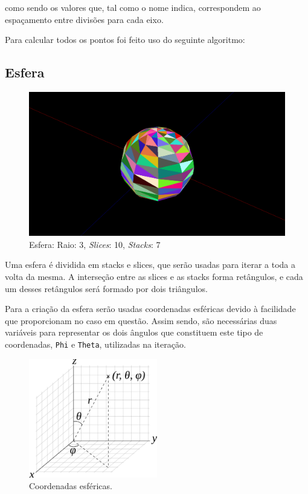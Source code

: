 \documentclass[a4paper]{article}
\begin{document}
como sendo os valores que, tal como o nome indica, correspondem ao espaçamento entre divisões para cada eixo.

Para calcular todos os pontos foi feito uso do seguinte algoritmo:


\subsection{Esfera}

\begin{figure}[H]
    \centering
    \includegraphics[width=\textwidth]{sphere.png}
    \caption{Esfera: Raio: 3, \textit{Slices}: 10, \textit{Stacks}: 7}
\end{figure}

Uma esfera é dividida em stacks e slices, que serão usadas para iterar a toda a volta da mesma. A interseção entre as slices e as stacks forma retângulos, e cada um desses retângulos será formado por dois triângulos.


Para a criação da esfera serão usadas coordenadas esféricas devido à facilidade que proporcionam no caso em questão. Assim sendo, são necessárias duas variáveis para representar os dois ângulos que constituem este tipo de coordenadas, \texttt{Phi} e \texttt{Theta}, utilizadas na iteração.

\begin{figure}[H]
    \centering
    \includegraphics[width=0.5\textwidth]{coords.png}
    \caption{Coordenadas esféricas.}
\end{figure}
\end{document}

